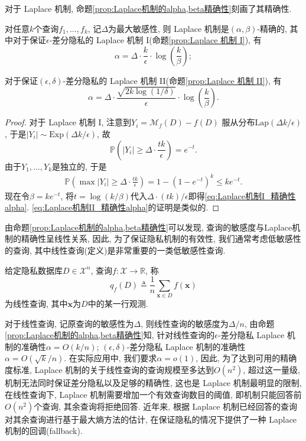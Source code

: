对于 Laplace 机制, 命题\ref{prop:Laplace机制的alpha,beta精确性}刻画了其精确性.
\begin{prop}\label{prop:Laplace机制的alpha,beta精确性}
  对任意$k$个查询$f_1, \dots, f_k$, 记$\Delta$为最大敏感性, 则 Laplace 机制是$(\alpha, \beta)$-精确的, 其中对于保证$\epsilon$-差分隐私的 Laplace 机制 I(命题\ref{prop:Laplace 机制 I}), 有
  \begin{equation}\label{eq:Laplace机制I_精确性alpha}
    \alpha = \Delta\cdot\frac{k}{\epsilon}\cdot\log\left(\frac{k}{\beta}\right);
  \end{equation}
    
  对于保证$(\epsilon, \delta)$-差分隐私的 Laplace 机制 II(命题\ref{prop:Laplace 机制 II}), 有
  \begin{equation}\label{eq:Laplace机制II_精确性alpha}
    \alpha = \Delta\cdot\frac{\sqrt{2k\log(1/\delta)}}{\epsilon}\cdot\log\left(\frac{k}{\beta}\right).
  \end{equation}
\end{prop}
\begin{proof}
  对于 Laplace 机制 I, 注意到$Y_i = \mathcal{M}_f(D) - f(D)$ 服从分布$\mathrm{Lap}(\Delta k/\epsilon)$, 于是$|Y_i| \sim \mathrm{Exp}(\Delta k/\epsilon)$, 故
  \[
    \mathbb P\left(|Y_i| \ge \Delta \cdot \frac{tk}{\epsilon}\right) = e^{-t}.
  \]
  由于$Y_1, \dots, Y_k$是独立的, 于是
  \[
    \begin{split}
      \mathbb P\left(\max|Y_i| \ge \Delta \cdot \frac{tk}{\epsilon}\right) = 1 - \left(1 - e^{-t}\right)^k \le ke^{-t}.
    \end{split}
  \]
  现在令$\beta = ke^{-t}$, 将$t = \log(k/\beta)$代入$\Delta\cdot (tk)/\epsilon$即得\eqref{eq:Laplace机制I_精确性alpha}. \eqref{eq:Laplace机制II_精确性alpha}的证明是类似的.
\end{proof}

由命题\ref{prop:Laplace机制的alpha,beta精确性}可以发现, 查询的敏感度与Laplace机制的精确性呈线性关系, 因此, 为了保证隐私机制的有效性, 我们通常考虑低敏感性的查询, 其中线性查询(定义)是非常重要的一类低敏感性查询.
\begin{defn}[线性查询]\label{defn:线性查询}
  给定隐私数据库$D \in \mathcal{X}^n$, 查询$f\colon \mathcal{X} \to \mathbb R$, 称
  \[
  q_f(D) \triangleq \frac{1}{n} \sum_{\mathbf{x}\in D} f(\mathbf{x})
  \]
  为线性查询, 其中$\mathbf{x}$为$D$中的某一行观测.
\end{defn}
对于线性查询, 记原查询的敏感性为$\Delta$, 则线性查询的敏感度为$\Delta/n$, 由命题\ref{prop:Laplace机制的alpha,beta精确性}知, 针对线性查询的$\epsilon$-差分隐私 Laplace 机制的准确性$\alpha = O(k/n)$; $(\epsilon, \delta)$-差分隐私 Laplace 机制的准确性$\alpha = O \left(\sqrt{k}/n\right)$. 在实际应用中, 我们要求$\alpha = o(1)$, 因此, 为了达到可用的精确度标准, Laplace 机制的关于线性查询的查询规模至多达到$O(n^2)$, 超过这一量级, 机制无法同时保证差分隐私以及足够的精确性, 这也是 Laplace 机制最明显的限制, 在线性查询下, Laplace 机制需要增加一个有效查询数目的阈值, 即机制只能回答前$O(n^2)$个查询, 其余查询将拒绝回答. 近年来, \parencite{chen2012integrating} 根据 Laplace 机制已经回答的查询对其余查询进行基于最大熵方法的估计, 在保证隐私的情况下提供了一种 Laplace 机制的回调(fallback).

